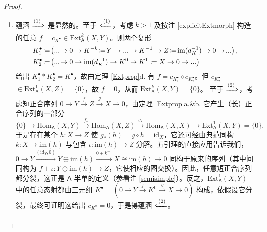 \begin{proof}
	\ \vspace*{0.0cm}
	\renewcommand{\theenumi}{\roman{enumi}}
	\begin{enumerate}[leftmargin=0.5cm]
		\item 蕴涵 $\xRightarrow{(1)}$ 是显然的。至于 $\xLeftarrow{(1)}$，考虑 $k>1$ 及按注 \ref{explicitExtmorph} 构造的任意 $f=c_{K^\bullet}\in\text{Ext}_\mathsf{A}^k(X,Y)$。则两个复形
		\begin{align*}
			\mkern-12mu K_1^\bullet\!&\coloneqq\!\big(...\!\rightarrow 0\rightarrow K^{-k}\!\coloneqq\! Y\rightarrow...\rightarrow K^{-1}\rightarrow Z\!\coloneqq\!\text{im}(d_K^{-1})\rightarrow 0\rightarrow\!...\big)\,, \\
			K_2^\bullet\!&\coloneqq\!\big(...\!\rightarrow 0\rightarrow \text{im}(d_K^{-1})\rightarrow K^0\rightarrow K^1\coloneqq X\rightarrow 0\rightarrow ...\big)
		\end{align*}
		给出 $K_1^\bullet\ast K_2^\bullet=K^\bullet$，故由定理 \ref{Extprop}d. 有 $f=c_{K_1^\bullet}\diamond c_{K_2^\bullet}$。但 $c_{K_2^\bullet}$ $\in\text{Ext}_\mathsf{A}^1(X,Z)=\{0\}$，故 $f=0$，从而 $\text{Ext}_\mathsf{A}^k(X,Y)=\{0\}$。
		\newline 至于 $\xRightarrow{(2)}$，考虑短正合序列 $0\rightarrow Y\xrightarrow{f} Z\xrightarrow{g} X\rightarrow 0$，由定理 \ref{Extprop}a.\&b. 它产生（长）正合序列的一部分 
		\vspace*{-0.2cm}
		\[
		\{0\}\rightarrow\text{Hom}_\mathsf{A}(X,Y)\xrightarrow{f_*}\text{Hom}_\mathsf{A}(X,Z)\xrightarrow{g_*}\text{Hom}_\mathsf{A}(X,X)\rightarrow\text{Ext}_\mathsf{A}^1(X,Y)\!=\!\{0\}.
		\]
		于是存在某个 $h:X\rightarrow Z$ 使 $g_*(h)=g\circ h=\text{id}_X$，它还可经由典范同构 $k:X\rightarrow\text{im}(h)$ 与包含 $\iota:\text{im}(h)\rightarrow Z$ 分解。五引理的直接应用告诉我们，$0\rightarrow Y\xrightarrow{(\text{id}_Y,0)} Y\oplus\text{im}(h)\xrightarrow{0+k^{-1}} X\cong\text{im}(h)\rightarrow 0$ 同构于原来的序列（其中间同构为 $f+\iota:Y\oplus\text{im}(h)\rightarrow Z$，它使相应的图交换）。因此，任意短正合序列都分裂，这正是 $\mathsf{A}$ 半单的定义（参看注 \ref{semisimple}）。反之，$\text{Ext}_\mathsf{A}^1(X,Y)$ 中的任意态射都由三元组 $K^\bullet=(0\rightarrow Y\xrightarrow{f} K^0\xrightarrow{g} X\rightarrow 0)$ 构成，依假设它分裂，最终可证明这给出 $c_{K^\bullet}=0$，于是得蕴涵 $\xLeftarrow{(2)}$。
		

\end{enumerate}
\end{proof}
